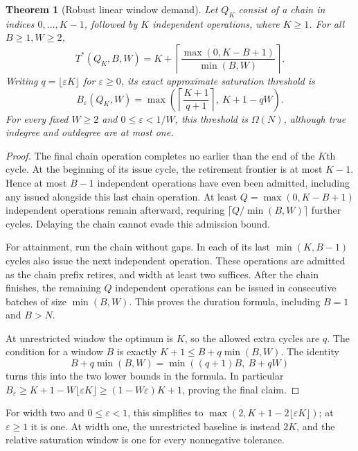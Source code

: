 \documentclass[11pt]{article}
\newtheorem{theorem}{Theorem}
\newcommand{\T}{T^*}
\begin{document}
\begin{theorem}[Robust linear window demand]
Let $Q_K$ consist of a chain in indices $0,\ldots,K-1$, followed by $K$
independent operations, where $K\ge1$. For all $B\ge1,W\ge2$,
\[
 \T(Q_K,B,W)=K+\left\lceil
 \frac{\max(0,K-B+1)}{\min(B,W)}\right\rceil.
\]
Writing $q=\lfloor\varepsilon K\rfloor$ for $\varepsilon\ge0$, its exact
approximate saturation threshold is
\[
 B_\varepsilon(Q_K,W)=\max\left(
 \left\lceil\frac{K+1}{q+1}\right\rceil,\ K+1-qW\right).
\]
For every fixed $W\ge2$ and $0\le\varepsilon<1/W$, this threshold is
$\Omega(N)$, although true indegree and outdegree are at most one.
\end{theorem}
\begin{proof}
The final chain operation completes no earlier than the end of the $K$th
cycle. At the beginning of its issue cycle, the retirement frontier is at
most $K-1$. Hence at most $B-1$ independent operations have even been
admitted, including any issued alongside this last chain operation. At least
$Q=\max(0,K-B+1)$ independent operations remain afterward, requiring
$\lceil Q/\min(B,W)\rceil$ further cycles. Delaying the chain cannot evade
this admission bound.

For attainment, run the chain without gaps. In each of its last
$\min(K,B-1)$ cycles also issue the next independent operation. These
operations are admitted as the chain prefix retires, and width at least two
suffices. After the chain finishes, the remaining $Q$ independent operations
can be issued in consecutive batches of size $\min(B,W)$. This proves the
duration formula, including $B=1$ and $B>N$.

At unrestricted window the optimum is $K$, so the allowed extra cycles are
$q$. The condition for a window $B$ is exactly
$K+1\le B+q\min(B,W)$. The identity
\[
 B+q\min(B,W)=\min((q+1)B,\ B+qW)
\]
turns this into the two lower bounds in the formula. In particular
$B_\varepsilon\ge K+1-W\lfloor\varepsilon K\rfloor
\ge(1-W\varepsilon)K+1$, proving the final claim.
\end{proof}
For width two and $0\le\varepsilon<1$, this simplifies to
$\max(2,K+1-2\lfloor\varepsilon K\rfloor)$; at $\varepsilon\ge1$ it is
one. At width one, the unrestricted baseline is instead $2K$, and the
relative saturation window is one for every nonnegative tolerance.
\end{document}
